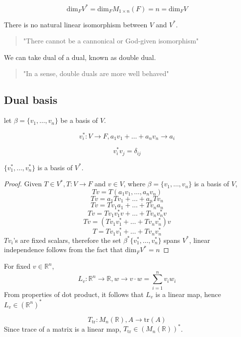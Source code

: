 \documentclass[11pt,a4paper]{colorart}
\def\l{\left}
\def\r{\right}
\def\R{\mathbb{R}}
\def\b{\beta}
\begin{document}
\[ \text{dim}_F V^* = \text{dim}_F M_{1\times n}\l(F\r) = n = \text{dim}_F V \]

There is no natural linear isomorphism between $V$ and $V^*$.

\begin{quote}
	"There cannot be a cannonical or God-given isomorphism"
\end{quote}

We can take dual of a dual, known as double dual.

\begin{quote}
	"In a sense, double duals are more well behaved"
\end{quote}

\subsection{Dual basis}

let $\b = \{v_1,\dots,v_n\}$ be a basis of $V$.

\[ v_i^*: V\rightarrow F, a_1v_1+\dots + a_nv_n\rightarrow a_i \]

\[ v_i^*v_j = \delta_{ij} \]

$\{v_1^*,\dots,v_n^*\}$ is a basis of $V^*$.

\begin{proof}
	Given $T \in V^*, T: V\rightarrow F$ and $v\in V$, where $\b = \{v_1,\dots,v_n\}$ is a basis of $V$,
	\[ Tv = T\l(a_1v_1,\dots,a_nv_n\r) \]
	\[ Tv = a_1Tv_1 + \dots + a_nTv_n \]
	\[ Tv = Tv_1a_1 + \dots + Tv_na_n \]
	\[ Tv = Tv_1v_1^*v + \dots + Tv_nv_n^*v \]
	\[ Tv = \l(Tv_1v_1^* + \dots + Tv_nv_n^*\r)v \]
	\[ T = Tv_1v_1^* + \dots + Tv_nv_n^* \]
	$Tv_i$'s are fixed scalars, therefore the set $\b^*\{v^*_1,\dots,v^*_n\}$ spans $V^*$, linear independence follows from the fact that dim$_FV^*=n$ 

\end{proof}

\begin{example}
	For fixed $v\in \R^n$,
	\[ L_v:\R^n \rightarrow \R, w \rightarrow v\cdot w = \sum_{i=1}^n v_iw_i \]
	From properties of dot product, it follows that $L_v$ is a linear map, hence $L_v \in \l(\R^n\r)^*$
\end{example}

\begin{example}
	\[ T_\text{tr}: M_n\l(\R\r), A \rightarrow \text{tr}\l(A\r) \]
	Since trace of a matrix is a linear map, $T_\text{tr}\in \l(M_n\l(\R\r)\r)^*$.
\end{example}
\end{document}
